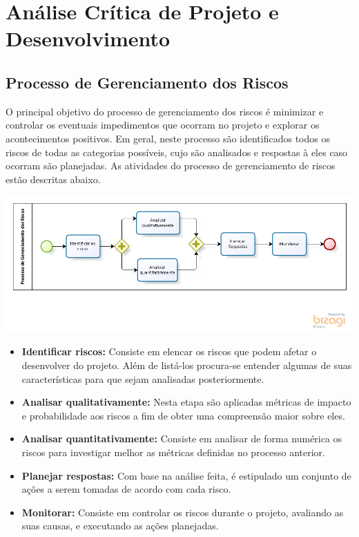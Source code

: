 \section{Análise Crítica de Projeto e Desenvolvimento}

\subsection{Processo de Gerenciamento dos Riscos}

O principal objetivo do processo de gerenciamento dos riscos é minimizar e controlar os eventuais impedimentos que ocorram no projeto e explorar os acontecimentos positivos. Em geral, neste processo são identificados todos os riscos de todas as categorias possíveis, cujo são analisados e respostas à eles caso ocorram são planejadas. As atividades do processo de gerenciamento de riscos estão descritas abaixo.

\begin{center}
	\includegraphics[scale=0.7]{figuras/riscos}
\end{center} 

\begin{itemize}
\item \textbf{Identificar riscos:}
Consiste em elencar os riscos que podem afetar o desenvolver do projeto. Além de listá-los procura-se entender algumas de suas características para que sejam analisadas posteriormente.
\item \textbf{Analisar qualitativamente:}
Nesta etapa são aplicadas métricas de impacto e probabilidade aos riscos a fim de obter uma compreensão maior sobre eles.
\item \textbf{Analisar quantitativamente:}
Consiste em analisar de forma numérica os riscos para investigar melhor as métricas definidas no processo anterior.
\item\textbf{Planejar respostas:}
Com base na análise feita, é estipulado um conjunto de ações a serem tomadas de acordo com cada risco.
\item \textbf{Monitorar:}
Consiste em controlar os riscos durante o projeto, avaliando as suas causas, e executando as ações planejadas.
\end{itemize}


